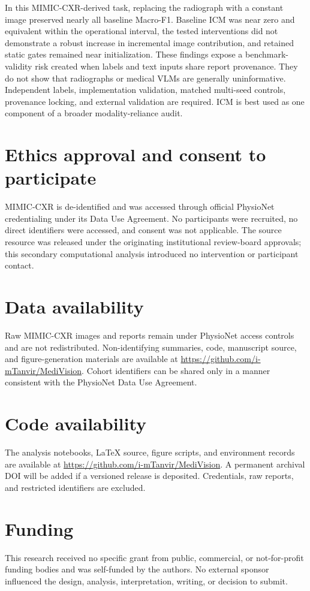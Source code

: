 \documentclass[10pt,a4paper,twocolumn]{article}
\begin{document}
In this MIMIC-CXR-derived task, replacing the radiograph with a constant image
preserved nearly all baseline Macro-F1. Baseline ICM was near zero and equivalent
within the operational interval, the tested interventions did not demonstrate a
robust increase in incremental image contribution, and retained static gates
remained near initialization. These findings expose a benchmark-validity risk
created when labels and text inputs share report provenance. They do not show
that radiographs or medical VLMs are generally uninformative. Independent
labels, implementation validation, matched multi-seed controls, provenance
locking, and external validation are required. ICM is best used as one component
of a broader modality-reliance audit.

\section*{Ethics approval and consent to participate}
MIMIC-CXR is de-identified and was accessed through official PhysioNet
credentialing under its Data Use Agreement. No participants were recruited, no
direct identifiers were accessed, and consent was not applicable. The source
resource was released under the originating institutional review-board
approvals; this secondary computational analysis introduced no intervention or
participant contact.

\section*{Data availability}
Raw MIMIC-CXR images and reports remain under PhysioNet access controls and are
not redistributed. Non-identifying summaries, code, manuscript source, and
figure-generation materials are available at
\url{https://github.com/i-mTanvir/MediVision}. Cohort identifiers can be shared
only in a manner consistent with the PhysioNet Data Use Agreement.

\section*{Code availability}
The analysis notebooks, LaTeX source, figure scripts, and environment records
are available at \url{https://github.com/i-mTanvir/MediVision}. A permanent
archival DOI will be added if a versioned release is deposited. Credentials,
raw reports, and restricted identifiers are excluded.

\section*{Funding}
This research received no specific grant from public, commercial, or
not-for-profit funding bodies and was self-funded by the authors. No external
sponsor influenced the design, analysis, interpretation, writing, or decision
to submit.
\end{document}

